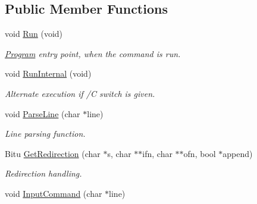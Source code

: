\subsection*{Public Member Functions}
\begin{DoxyCompactItemize}
\item 
\hypertarget{classDOS__Shell_a37ec1896f94ab70c29368bd09fb71997}{void \hyperlink{classDOS__Shell_a37ec1896f94ab70c29368bd09fb71997}{Run} (void)}\label{classDOS__Shell_a37ec1896f94ab70c29368bd09fb71997}

\begin{DoxyCompactList}\small\item\em \hyperlink{classProgram}{Program} entry point, when the command is run. \end{DoxyCompactList}\item 
\hypertarget{classDOS__Shell_abba5a3bde7767e73ebbd1452de6ba3c0}{void \hyperlink{classDOS__Shell_abba5a3bde7767e73ebbd1452de6ba3c0}{Run\-Internal} (void)}\label{classDOS__Shell_abba5a3bde7767e73ebbd1452de6ba3c0}

\begin{DoxyCompactList}\small\item\em Alternate execution if /\-C switch is given. \end{DoxyCompactList}\item 
\hypertarget{classDOS__Shell_ad4280cf9e2c07d534b7e32f9c58749d3}{void \hyperlink{classDOS__Shell_ad4280cf9e2c07d534b7e32f9c58749d3}{Parse\-Line} (char $\ast$line)}\label{classDOS__Shell_ad4280cf9e2c07d534b7e32f9c58749d3}

\begin{DoxyCompactList}\small\item\em Line parsing function. \end{DoxyCompactList}\item 
\hypertarget{classDOS__Shell_a0b5e187d0f5a8a0230ea9e741079018d}{Bitu \hyperlink{classDOS__Shell_a0b5e187d0f5a8a0230ea9e741079018d}{Get\-Redirection} (char $\ast$s, char $\ast$$\ast$ifn, char $\ast$$\ast$ofn, bool $\ast$append)}\label{classDOS__Shell_a0b5e187d0f5a8a0230ea9e741079018d}

\begin{DoxyCompactList}\small\item\em Redirection handling. \end{DoxyCompactList}\item 
\hypertarget{classDOS__Shell_a3e2a3258d53dc6309adc9f1d3c8cde49}{void \hyperlink{classDOS__Shell_a3e2a3258d53dc6309adc9f1d3c8cde49}{Input\-Command} (char $\ast$line)}\label{classDOS__Shell_a3e2a3258d53dc6309adc9f1d3c8cde49}


\end{DoxyCompactItemize}
